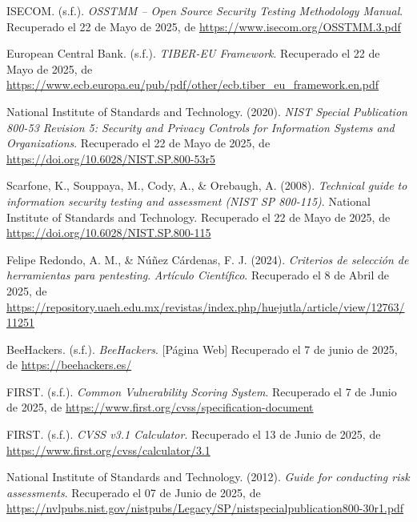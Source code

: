 \documentclass[a4paper, 11pt]{article}
\begin{document}
\begin{thebibliography}{99}
    ISECOM. (s.f.). \textit{OSSTMM – Open Source Security Testing Methodology Manual}. Recuperado el 22 de Mayo de 2025, de \url{https://www.isecom.org/OSSTMM.3.pdf}

    European Central Bank. (s.f.). \textit{TIBER-EU Framework}. Recuperado el 22 de Mayo de 2025, de \url{https://www.ecb.europa.eu/pub/pdf/other/ecb.tiber_eu_framework.en.pdf}

    National Institute of Standards and Technology. (2020). \textit{NIST Special Publication 800-53 Revision 5: Security and Privacy Controls for Information Systems and Organizations}. Recuperado el 22 de Mayo de 2025, de \url{https://doi.org/10.6028/NIST.SP.800-53r5}

    Scarfone, K., Souppaya, M., Cody, A., \& Orebaugh, A. (2008). \textit{Technical guide to information security testing and assessment (NIST SP 800-115)}. National Institute of Standards and Technology. Recuperado el 22 de Mayo de 2025, de \url{https://doi.org/10.6028/NIST.SP.800-115}

    Felipe Redondo, A. M., \& Núñez Cárdenas, F. J. (2024). \textit{Criterios de selección de herramientas para pentesting}. \textit{Artículo Científico}. Recuperado el 8 de Abril de 2025, de \url{https://repository.uaeh.edu.mx/revistas/index.php/huejutla/article/view/12763/11251}
   
    BeeHackers. (s.f.). \textit{BeeHackers}. [Página Web] Recuperado el 7 de junio de 2025, de \url{https://beehackers.es/}

    FIRST. (s.f.). \textit{Common Vulnerability Scoring System}. Recuperado el 7 de Junio de 2025, de \url{https://www.first.org/cvss/specification-document}

    FIRST. (s.f.). \textit{CVSS v3.1 Calculator}. Recuperado el 13 de Junio de 2025, de \url{https://www.first.org/cvss/calculator/3.1}

    National Institute of Standards and Technology. (2012). \textit{Guide for conducting risk assessments}.  Recuperado el 07 de Junio de 2025, de \url{https://nvlpubs.nist.gov/nistpubs/Legacy/SP/nistspecialpublication800-30r1.pdf}


\end{thebibliography}


\clearpage
\end{document}
